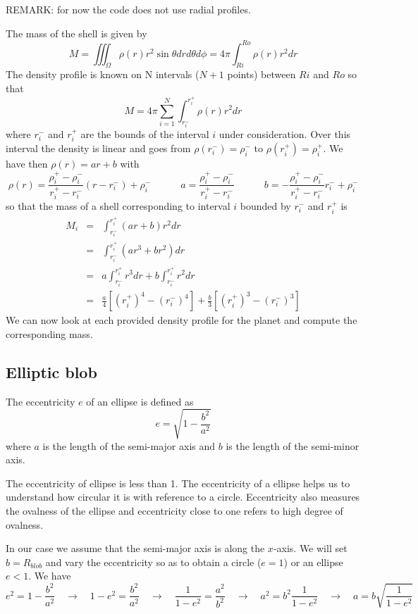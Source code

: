 REMARK: for now the code does not use radial profiles.


The mass of the shell is given by
\[
M= \iiint_\Omega \rho(r) r^2 \sin\theta dr d\theta d\phi
= 4\pi \int_{Ri}^{Ro} \rho(r) r^2 dr
\]
The density profile is known on N intervals ($N+1$ points) between $Ri$ and $Ro$ so that 
\[
M = 4\pi \sum_{i=1}^N \int_{r_i^-}^{r_i^+} \rho(r) r^2 dr
\]
where $r_i^-$ and $r_i^+$ are the bounds of the interval $i$
under consideration.
Over this interval the density is linear and goes from $\rho(r_i^-)=\rho_i^-$ to $\rho(r_i^+)=\rho_i^+$. 
We have then $\rho(r)=ar+b$ with 
\[
\rho(r) = \frac{\rho_i^+-\rho_i^-}{r_i^+-r_i^-}(r-r_i^-)+\rho_i^-
\qquad\quad
a= \frac{\rho_i^+-\rho_i^-}{r_i^+-r_i^-}
\qquad\quad
b=-\frac{\rho_i^+-\rho_i^-}{r_i^+-r_i^-}r_i^- + \rho_i^-
\]
so that the mass of a shell corresponding to interval $i$ 
bounded by $r_i^-$ and $r_i^+$ is
\begin{eqnarray}
M_i 
&=& \int_{r_i^-}^{r_i^+} (ar+b)r^2 dr  \nonumber\\
&=& \int_{r_i^-}^{r_i^+} (ar^3+br^2) dr  \nonumber\\
&=& a\int_{r_i^-}^{r_i^+} r^3 dr 
+b\int_{r_i^-}^{r_i^+} r^2 dr \nonumber\\
&=& \frac{a}{4} \left[ (r_i^+)^4 -(r_i^-)^4  \right]
+\frac{b}{3} \left[ (r_i^+)^3 -(r_i^-)^3 \right]
\end{eqnarray}
We can now look at each provided density profile for the planet and
compute the corresponding mass.


\subsection*{Elliptic blob}

The eccentricity $e$ of an ellipse is defined as 
\[
e=\sqrt{1-\frac{b^2}{a^2}}
\]
where $a$ is the length of the semi-major axis and $b$ is the length of the semi-minor axis.

The eccentricity of ellipse is less than 1. The eccentricity of a ellipse helps us to understand how circular it is with reference to a circle. Eccentricity also measures the ovalness of the ellipse and eccentricity close to one refers to high degree of ovalness.

In our case we assume that the semi-major axis is along the $x$-axis.
We will set $b=R_{blob}$ and vary the eccentricity so as to obtain a circle ($e=1$) or an ellipse $e<1$.
We have
\[
e^2 = 1 -\frac{b^2}{a^2}
\quad
\rightarrow
\quad
1-e^2 = \frac{b^2}{a^2}
\quad
\rightarrow
\quad
\frac{1}{1-e^2} = \frac{a^2}{b^2}
\quad
\rightarrow
\quad
a^2 = b^2 \frac{1}{1-e^2} 
\quad
\rightarrow
\quad
a = b \sqrt{\frac{1}{1-e^2}}
\]

